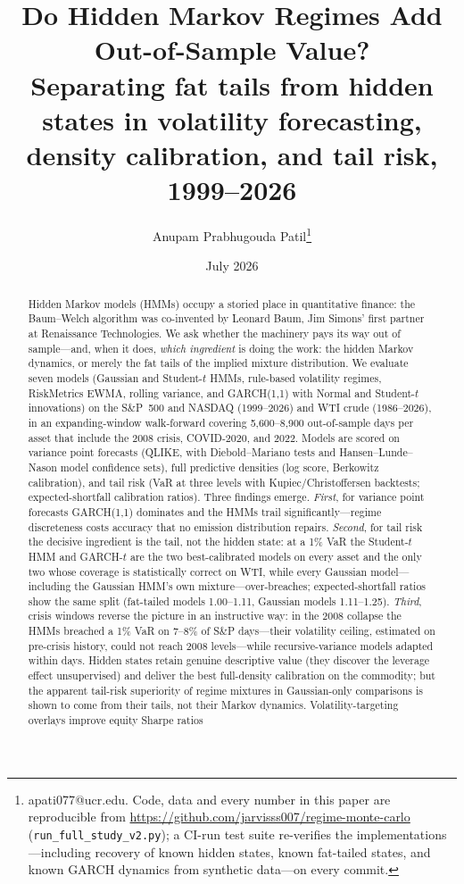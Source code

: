 \documentclass[11pt]{article}
\title{Do Hidden Markov Regimes Add Out-of-Sample Value?\\
\large Separating fat tails from hidden states in volatility forecasting,
density calibration, and tail risk, 1999--2026}
\author{Anupam Prabhugouda Patil\thanks{apati077@ucr.edu. Code, data and every
number in this paper are reproducible from
\url{https://github.com/jarvisss007/regime-monte-carlo}
(\texttt{run\_full\_study\_v2.py}); a CI-run test suite re-verifies the
implementations---including recovery of known hidden states, known
fat-tailed states, and known GARCH dynamics from synthetic data---on every
commit.}}
\date{July 2026}
\begin{document}
\maketitle

\begin{abstract}
\noindent Hidden Markov models (HMMs) occupy a storied place in quantitative
finance: the Baum--Welch algorithm was co-invented by Leonard Baum, Jim
Simons' first partner at Renaissance Technologies. We ask whether the
machinery pays its way out of sample---and, when it does, \emph{which
ingredient} is doing the work: the hidden Markov dynamics, or merely the fat
tails of the implied mixture distribution. We evaluate seven models
(Gaussian and Student-$t$ HMMs, rule-based volatility regimes, RiskMetrics
EWMA, rolling variance, and GARCH(1,1) with Normal and Student-$t$
innovations) on the S\&P~500 and NASDAQ (1999--2026) and WTI crude
(1986--2026), in an expanding-window walk-forward covering 5{,}600--8{,}900
out-of-sample days per asset that include the 2008 crisis, COVID-2020, and
2022. Models are scored on variance point forecasts (QLIKE, with
Diebold--Mariano tests and Hansen--Lunde--Nason model confidence sets), full
predictive densities (log score, Berkowitz calibration), and tail risk (VaR
at three levels with Kupiec/Christoffersen backtests; expected-shortfall
calibration ratios). Three findings emerge. \emph{First}, for variance point
forecasts GARCH(1,1) dominates and the HMMs trail significantly---regime
discreteness costs accuracy that no emission distribution repairs.
\emph{Second}, for tail risk the decisive ingredient is the tail, not the
hidden state: at a 1\% VaR the Student-$t$ HMM and GARCH-$t$ are the two
best-calibrated models on every asset and the only two whose coverage is
statistically correct on WTI, while every Gaussian model---including the
Gaussian HMM's own mixture---over-breaches; expected-shortfall ratios show
the same split (fat-tailed models 1.00--1.11, Gaussian models 1.11--1.25).
\emph{Third}, crisis windows reverse the picture in an instructive way: in
the 2008 collapse the HMMs breached a 1\% VaR on 7--8\% of S\&P days---their
volatility ceiling, estimated on pre-crisis history, could not reach
2008 levels---while recursive-variance models adapted within days. Hidden
states retain genuine descriptive value (they discover the leverage effect
unsupervised) and deliver the best full-density calibration on the
commodity; but the apparent tail-risk superiority of regime mixtures in
Gaussian-only comparisons is shown to come from their tails, not their
Markov dynamics. Volatility-targeting overlays improve equity Sharpe ratios

\end{abstract}
\end{document}
